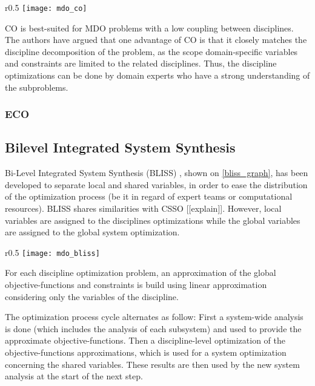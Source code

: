 \begin{wrapfigure}{r}{0.5\textwidth}
\centering
\texttt{[image: mdo\_co]}
\caption{CO method}\label{co_graph}
\end{wrapfigure}

CO is best-suited for MDO problems with a low coupling between disciplines. The authors have argued that one advantage of CO is that it closely matches the discipline decomposition of the problem, as the scope domain-specific variables and constraints are limited to the related disciplines. Thus, the discipline optimizations can be done by domain experts  who have a strong understanding of the subproblems.

\subsubsection{ECO}

\subsection{Bilevel Integrated System Synthesis}

Bi-Level Integrated System Synthesis (BLISS) \cite{J.:1998:BIS:886310}, shown on \figurename{} \ref{bliss_graph}, has been developed to separate local and shared variables, in order to ease the distribution of the optimization process (be it in regard of expert teams or computational resources).
BLISS shares similarities with CSSO [[explain]]. However, local variables are assigned to the disciplines optimizations while the global variables are assigned to the global system optimization.

\begin{wrapfigure}{r}{0.5\textwidth}
\centering
\texttt{[image: mdo\_bliss]}
\caption{BLISS method}\label{bliss_graph}
\end{wrapfigure}

For each discipline optimization problem, an approximation of the global objective-functions and constraints is build using linear approximation considering only the variables of the discipline.

The optimization process cycle alternates as follow: First a system-wide analysis is done (which includes the analysis of each subsystem) and used to provide the approximate objective-functions. Then a discipline-level optimization of the objective-functions approximations, which is used for a system optimization concerning the shared variables. These results are then used by the new system analysis at the start of the next step.

